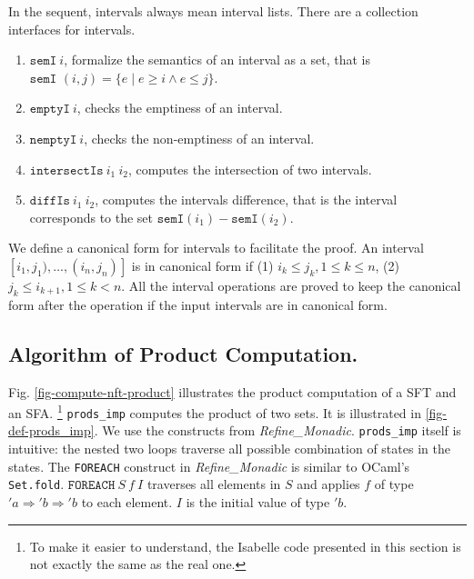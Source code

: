 \documentclass[a4paper,UKenglish,cleveref, autoref, thm-restate]{lipics-v2021}
\begin{document}
In the sequent, intervals always mean interval lists.
There are a collection interfaces for intervals. 
\begin{enumerate}
  \item $\texttt{semI}~i$, formalize the semantics of an interval as a set, that is $\texttt{semI }(i,j) = \{e \mid e \geq i \land e \leq j\}$.
  \item $\texttt{emptyI}~i$, checks the emptiness of an interval.
   \item $\texttt{nemptyI}~i$, checks the non-emptiness of an interval.
  \item $\texttt{intersectIs}~i_1~i_2$, computes the intersection of two intervals.
  \item $\texttt{diffIs}~i_1~i_2$, computes the intervals difference, that is the interval corresponds to the set $\texttt{semI}(i_1)-\texttt{semI}(i_2)$.
\end{enumerate}

We define a canonical form for intervals to facilitate the proof. An interval $[i_1, j_1), \ldots, (i_n, j_n)]$ is in canonical form if 
(1) $i_k \leq j_k, 1 \leq k \leq n$,
(2) $j_k\leq i_{k+1}, 1 \leq k < n$.
All the interval operations are proved to keep the canonical form after the operation if the input intervals are in canonical form.




\subsection{Algorithm of Product Computation.}

Fig. \ref{fig-compute-nft-product} illustrates the product computation of a SFT and an SFA. \footnote{To make it easier to understand, the Isabelle code presented in this section is not exactly the same as the real one.}
\texttt{prods\_imp} computes the product of two sets. It is illustrated in \ref{fig-def-prods_imp}. We use the constructs from \emph{Refine\_Monadic}. \texttt{prods\_imp} itself is intuitive: the nested two loops traverse all possible combination of states in the states. 
The \texttt{FOREACH} construct in \emph{Refine\_Monadic} is similar to OCaml's \texttt{Set.fold}. $\texttt{FOREACH}~S~f~I$ traverses all elements in $S$ and applies $f$ of type $'a \Rightarrow 'b \Rightarrow 'b$ to each element. $I$ is the initial value of type $'b$.
\end{document}
